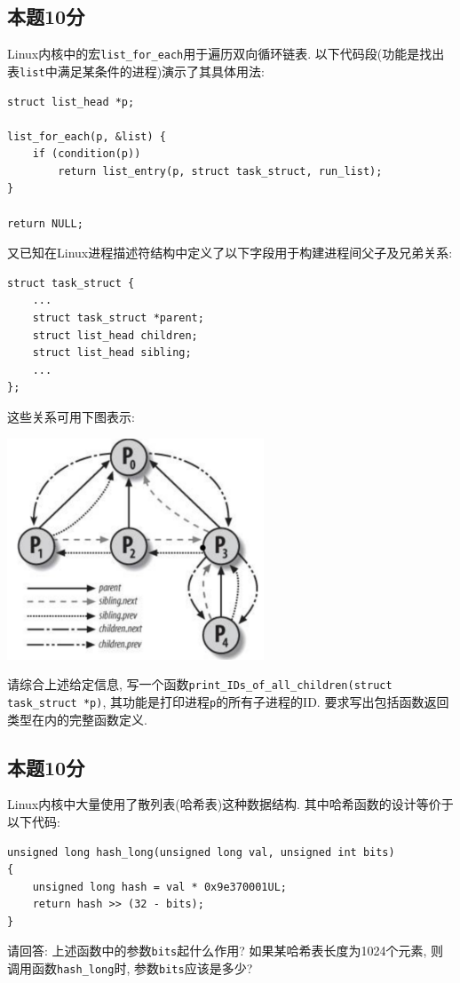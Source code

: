 \documentclass[a4paper,11pt]{article}
\begin{document}
\begin{CJK*}{UTF8}{gbsn}
\subsection{本题10分}
Linux内核中的宏\verb|list_for_each|用于遍历双向循环链表. 以下代码段(功能是找出表\verb|list|中满足某条件的进程)演示了其具体用法:
\begin{verbatim}
struct list_head *p;

list_for_each(p, &list) {
    if (condition(p))  
        return list_entry(p, struct task_struct, run_list);
}

return NULL;
\end{verbatim}
又已知在Linux进程描述符结构中定义了以下字段用于构建进程间父子及兄弟关系:
\begin{verbatim}
struct task_struct {
    ...
    struct task_struct *parent; 
    struct list_head children; 
    struct list_head sibling; 
    ...
};
\end{verbatim}

这些关系可用下图表示:

\includegraphics{parent4.png}

请综合上述给定信息, 写一个函数\verb|print_IDs_of_all_children(struct task_struct *p)|,
其功能是打印进程\verb|p|的所有子进程的ID. 要求写出包括函数返回类型在内的完整函数定义.
\\[3in]
\subsection{本题10分}
Linux内核中大量使用了散列表(哈希表)这种数据结构. 其中哈希函数的设计等价于以下代码:
\begin{verbatim}
unsigned long hash_long(unsigned long val, unsigned int bits)
{
    unsigned long hash = val * 0x9e370001UL;
    return hash >> (32 - bits);
}
\end{verbatim}
请回答: 上述函数中的参数\verb|bits|起什么作用? 如果某哈希表长度为1024个元素, 则调用函数\verb|hash_long|时,
参数\verb|bits|应该是多少?
\\[1.5in]


\end{CJK*}
\end{document}
